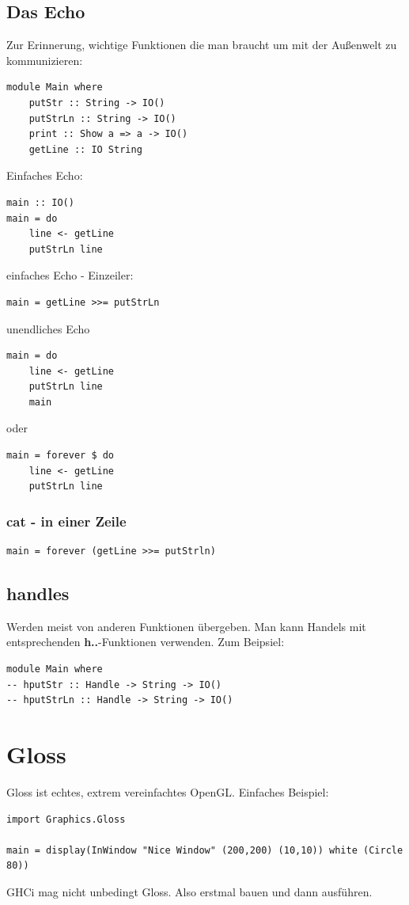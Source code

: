 \documentclass[ngerman,a4paper]{report}
\begin{document}
\subsection{Das Echo}
Zur Erinnerung, wichtige Funktionen die man braucht um mit der Außenwelt zu kommunizieren:
\begin{lstlisting}
module Main where
	putStr :: String -> IO()
	putStrLn :: String -> IO()
	print :: Show a => a -> IO()
	getLine :: IO String
\end{lstlisting}
Einfaches Echo:
\begin{lstlisting}
main :: IO()
main = do
	line <- getLine
	putStrLn line
\end{lstlisting}
einfaches Echo - Einzeiler:
\begin{lstlisting}
main = getLine >>= putStrLn
\end{lstlisting}
unendliches Echo
\begin{lstlisting}
main = do
	line <- getLine
	putStrLn line
	main
\end{lstlisting}
oder
\begin{lstlisting}
main = forever $ do
	line <- getLine
	putStrLn line
\end{lstlisting}
\subsubsection{cat - in einer Zeile}
\begin{lstlisting}
main = forever (getLine >>= putStrln)
\end{lstlisting}
\subsection{handles}
Werden meist von anderen Funktionen übergeben. Man kann Handels mit entsprechenden \textbf{h..}-Funktionen verwenden. Zum Beipsiel:
\begin{lstlisting}
module Main where
-- hputStr :: Handle -> String -> IO()
-- hputStrLn :: Handle -> String -> IO()
\end{lstlisting}

\section{Gloss}
Gloss ist echtes, extrem vereinfachtes OpenGL. Einfaches Beispiel: 
\begin{lstlisting}
import Graphics.Gloss

main = display(InWindow "Nice Window" (200,200) (10,10)) white (Circle 80))
\end{lstlisting}
GHCi mag nicht unbedingt Gloss. Also erstmal bauen und dann ausführen.\\
\end{document}
